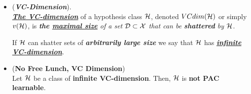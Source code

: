 \documentclass[11pt]{article}
\begin{document}
\begin{itemize}
\item \begin{definition} (\emph{\textbf{VC-Dimension}}). \\
\underline{\emph{\textbf{The VC-dimension}}} of a hypothesis class ${\mathcal H}$, denoted $VCdim({\mathcal H})$ or simply $v({\mathcal H})$, is \emph{\textbf{the \underline{maximal size}} of a set ${\mathcal D} \subset {\mathcal X}$ that can be \textbf{shattered} by ${\mathcal H}$}.

If ${\mathcal H}$ can shatter sets of \emph{\textbf{arbitrarily large size}} we say that ${\mathcal H}$ has \underline{\emph{\textbf{infinite VC-dimension}}}.
\end{definition}

\item \begin{theorem} (\textbf{No Free Lunch, VC Dimension}) \citep{shalev2014understanding}\\
Let ${\mathcal H}$ be a class of \textbf{infinite VC-dimension}. Then, ${\mathcal H}$ is \textbf{not PAC learnable}.
\end{theorem}

\end{itemize}
\end{document}
